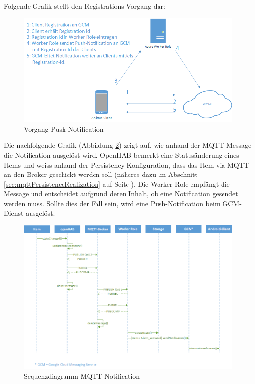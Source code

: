 Folgende Grafik stellt den Registrations-Vorgang dar:
\begin{figure}[H]
	\centering
		\includegraphics[scale=0.7]{report/img/gcm}
	\caption{Vorgang Push-Notification}
	\label{fig:notification}
\end{figure}

Die nachfolgende Grafik (Abbildung \ref{fig:sequenzNotification}) zeigt auf, wie anhand der MQTT-Message die Notification ausgelöst wird. OpenHAB bemerkt eine Statusänderung eines Items und weiss anhand der Persistency Konfiguration, dass das Item via MQTT an den Broker geschickt werden soll (näheres dazu im Abschnitt \ref{sec:mqttPersistenceRealization} auf Seite \pageref{sec:mqttPersistenceRealization}). Die Worker Role empfängt die Message und entscheidet aufgrund deren Inhalt, ob eine Notification gesendet werden muss. Sollte dies der Fall sein, wird eine Push-Notification beim GCM-Dienst ausgelöst.

\begin{figure}[H]
	\centering
		\includegraphics[scale=0.65]{report/img/sequenzDiagramNotification}
	\caption{Sequenzdiagramm MQTT-Notification}
	\label{fig:sequenzNotification}
\end{figure}

